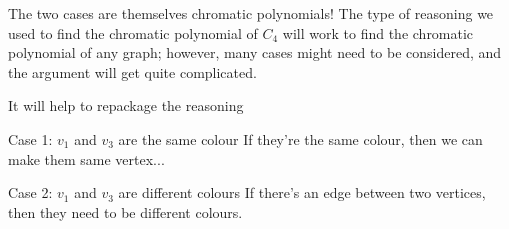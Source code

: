 \documentclass{beamer}
\begin{document}
\begin{frame}{The two cases are themselves chromatic polynomials!}
  The type of reasoning we used to find the chromatic polynomial of $C_4$ will work to find the chromatic polynomial of any graph; however, many cases might need to be considered, and the argument will get quite complicated.

  \begin{block}{It will help to repackage the reasoning}
    \end{block}

  \begin{block}{Case 1: $v_1$ and $v_3$ are the same colour}
If they're the same colour, then we can make them same vertex...
        \end{block}
  
  \begin{block}{Case 2: $v_1$ and $v_3$ are different colours}
        If there's an edge between two vertices, then they need to be different colours.
  \end{block}

\end{frame}
\end{document}
